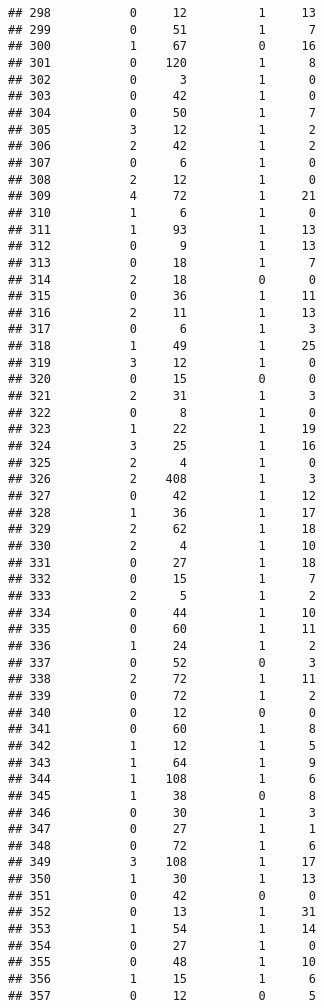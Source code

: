 \documentclass[]{article}
\begin{document}
\begin{verbatim}
## 298           0     12          1     13
## 299           0     51          1      7
## 300           1     67          0     16
## 301           0    120          1      8
## 302           0      3          1      0
## 303           0     42          1      0
## 304           0     50          1      7
## 305           3     12          1      2
## 306           2     42          1      2
## 307           0      6          1      0
## 308           2     12          1      0
## 309           4     72          1     21
## 310           1      6          1      0
## 311           1     93          1     13
## 312           0      9          1     13
## 313           0     18          1      7
## 314           2     18          0      0
## 315           0     36          1     11
## 316           2     11          1     13
## 317           0      6          1      3
## 318           1     49          1     25
## 319           3     12          1      0
## 320           0     15          0      0
## 321           2     31          1      3
## 322           0      8          1      0
## 323           1     22          1     19
## 324           3     25          1     16
## 325           2      4          1      0
## 326           2    408          1      3
## 327           0     42          1     12
## 328           1     36          1     17
## 329           2     62          1     18
## 330           2      4          1     10
## 331           0     27          1     18
## 332           0     15          1      7
## 333           2      5          1      2
## 334           0     44          1     10
## 335           0     60          1     11
## 336           1     24          1      2
## 337           0     52          0      3
## 338           2     72          1     11
## 339           0     72          1      2
## 340           0     12          0      0
## 341           0     60          1      8
## 342           1     12          1      5
## 343           1     64          1      9
## 344           1    108          1      6
## 345           1     38          0      8
## 346           0     30          1      3
## 347           0     27          1      1
## 348           0     72          1      6
## 349           3    108          1     17
## 350           1     30          1     13
## 351           0     42          0      0
## 352           0     13          1     31
## 353           1     54          1     14
## 354           0     27          1      0
## 355           0     48          1     10
## 356           1     15          1      6
## 357           0     12          0      5

\end{verbatim}
\end{document}
